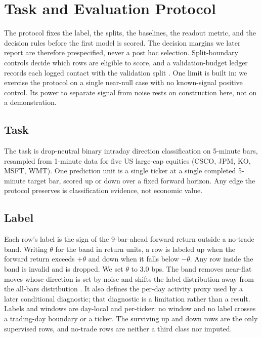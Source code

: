 \section{Task and Evaluation Protocol}\label{sec:protocol}

The protocol fixes the label, the splits, the baselines, the readout metric, and
the decision rules before the first model is scored. The decision margins we later report
are therefore prespecified, never a post hoc selection. Split-boundary controls
decide which rows are eligible to score, and a validation-budget ledger records
each logged contact with the validation split
\cite{kapoor2023leakage,lopezdeprado2018advances}. One limit is built in: we
exercise the protocol on a single near-null case with no known-signal positive
control. Its power to separate signal from noise rests on construction here,
not on a demonstration.

\subsection{Task}

The task is drop-neutral binary intraday direction classification on 5-minute
bars, resampled from 1-minute data for five US large-cap equities (CSCO, JPM,
KO, MSFT, WMT). One prediction unit is a single ticker at a single completed
5-minute target bar, scored up or down over a fixed forward horizon. Any edge
the protocol preserves is classification evidence, not economic value.

\subsection{Label}

Each row's label is the sign of the 9-bar-ahead forward return outside a no-trade
band. Writing \(\theta\) for the band in return units, a row is labeled up when
the forward return exceeds \(+\theta\) and down when it falls below \(-\theta\).
Any row inside the band is invalid and is dropped. We set \(\theta\) to \(3.0\) bps.
The band removes near-flat moves whose direction is set by noise
\cite{xu2018stock,sun2017predicting} and shifts the label distribution away from
the all-bars distribution \cite{zadrozny2004learning}. It also defines the
per-day activity proxy used by a later conditional diagnostic; that diagnostic is a
limitation rather than a result. Labels and windows are day-local and
per-ticker: no window and no label crosses a trading-day boundary or a ticker.
The surviving up and down rows are the only supervised rows, and no-trade rows
are neither a third class nor imputed.

